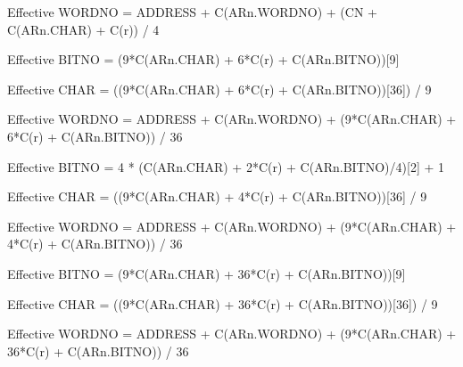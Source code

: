 Effective WORDNO = ADDRESS + C(ARn.WORDNO) + (CN + C(ARn.CHAR) + C(r)) / 4


Effective BITNO = (9*C(ARn.CHAR) + 6*C(r) + C(ARn.BITNO))[9]

Effective CHAR = ((9*C(ARn.CHAR) + 6*C(r) + C(ARn.BITNO))[36]) / 9

Effective WORDNO = ADDRESS + C(ARn.WORDNO) + (9*C(ARn.CHAR) + 6*C(r) + C(ARn.BITNO)) / 36


Effective BITNO = 4 * (C(ARn.CHAR) + 2*C(r) + C(ARn.BITNO)/4)[2] + 1

Effective CHAR = ((9*C(ARn.CHAR) + 4*C(r) + C(ARn.BITNO))[36] / 9

Effective WORDNO = ADDRESS + C(ARn.WORDNO) + (9*C(ARn.CHAR) + 4*C(r) + C(ARn.BITNO)) / 36


Effective BITNO = (9*C(ARn.CHAR) + 36*C(r) + C(ARn.BITNO))[9]

Effective CHAR = ((9*C(ARn.CHAR) + 36*C(r) + C(ARn.BITNO))[36]) / 9

Effective WORDNO = ADDRESS + C(ARn.WORDNO) + (9*C(ARn.CHAR) + 36*C(r) + C(ARn.BITNO)) / 36





